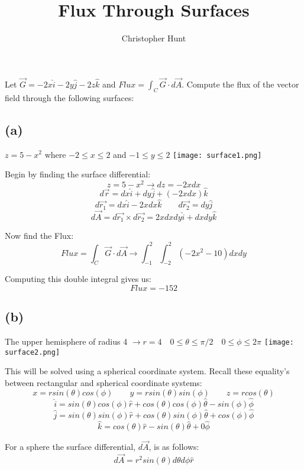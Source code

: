 \documentclass[11pt]{article}
\title{Flux Through Surfaces}
\author{Christopher Hunt}
\date{}
\begin{document}
\pagestyle{fancy}
\fancyhf{}
\rhead{\thepage}
\maketitle

Let $\vec{G} = -2x\hat{i} -2y\hat{j} -2z \hat{k}$ and $Flux = \int_C \vec{G} \cdot d\vec{A}$. Compute the flux of the vector field through the following surfaces:

\subsection*{(a)}
\begin{center}
    $z = 5-x^2$ where $-2 \leq x \leq 2$ and $-1 \leq y \leq 2$
    \texttt{[image: surface1.png]}
\end{center}

Begin by finding the surface differential:
$$z = 5-x^2 \rightarrow dz = -2xdx$$
$$d\vec{r} = dx\hat{i} + dy\hat{j} + (-2xdx)\hat{k}$$
$$d\vec{r_1} = dx\hat{i} - 2xdx\hat{k} \qquad d\vec{r_2} = dy\hat{j} $$
$$d\vec{A} = d\vec{r_1} \times d\vec{r_2} = 2xdxdy \hat{i} + dxdy\hat{k}$$

Now find the Flux:
$$Flux = \int_C \vec{G} \cdot d\vec{A} \rightarrow \int_{-1}^2\int_{-2}^2 (-2x^2-10)dxdy$$

Computing this double integral gives us:
$$Flux = -152$$

\subsection*{(b)}
\begin{center}
    The upper hemisphere of radius 4 $\rightarrow r = 4 \quad 0 \leq \theta \leq \pi /2 \quad 0 \leq \phi \leq 2\pi$
        \texttt{[image: surface2.png]}
\end{center}

This will be solved using a spherical coordinate system.
Recall these equality's between rectangular and spherical coordinate systems:
$$x = r sin(\theta)cos(\phi) \qquad y = rsin(\theta)sin(\phi) \qquad z = r cos(\theta)$$
$$\hat{i} = sin(\theta)cos(\phi)\hat{r}+cos(\theta)cos(\phi)\hat{\theta}-sin(\phi)\hat{\phi}$$
$$\hat{j} = sin(\theta)sin(\phi)\hat{r}+cos(\theta)sin(\phi)\hat{\theta}+cos(\phi)\hat{\phi}$$
$$\hat{k} = cos(\theta)\hat{r}-sin(\theta)\hat{\theta}+0\hat{\phi}$$

For a sphere the surface differential, $d\vec{A}$, is as follows:
$$d\vec{A} = r^2sin(\theta)d\theta d\phi \hat{r}$$
\end{document}
